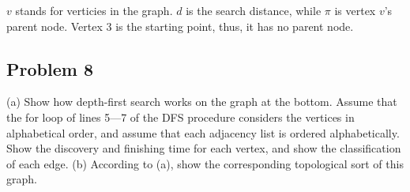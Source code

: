 \documentclass[a4paper]{article}
\makeatletter
\newenvironment{solution}
  {\begin{proof}[Solution]}
  {\end{proof}}
\renewenvironment{proof}[1][\proofname]{%
  \par\pushQED{\qed}\normalfont%
  \topsep6\p@\@plus6\p@\relax
  \trivlist\item[\hskip\labelsep\bfseries#1\@addpunct{.}]%
  \ignorespaces
}{%
  \popQED\endtrivlist\@endpefalse
}
\makeatother
\begin{document}
\begin{solution}
$v$ stands for verticies in the graph. $d$ is the search distance, while $\pi$ is vertex $v$'s parent node. Vertex 3 is the starting point, thus, it has no parent node.
\end{solution}

\subsection*{Problem 8}
(a) Show how depth-first search works on the graph at the bottom. Assume that the for loop of lines 5—7 of the DFS procedure considers the vertices in alphabetical order, and assume that each adjacency list is ordered alphabetically. Show the discovery and finishing time for each vertex, and show the classification of each edge. (b) According to (a), show the corresponding topological sort of this graph.
\end{document}
